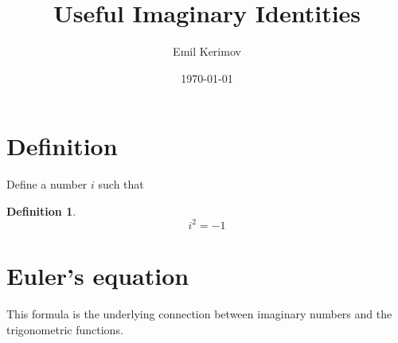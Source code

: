 \documentclass[a4paper]{article}
\title{Useful Imaginary Identities}
\author{Emil Kerimov}
\date{\today}
\begin{document}
\maketitle


\newtheorem{theorem}{Theorem}[section]
\newtheorem{corollary}{Corollary}[theorem]
\newtheorem{lemma}[theorem]{Lemma}
\newtheorem{definition}{Definition}[section]


\section{Definition}
Define a number $i$ such that 
\begin{definition} \label{i def}
$$
\boxed{
i^2 = -1
}$$
\end{definition}

\section{Euler's equation}
This formula is the underlying connection between imaginary numbers and the trigonometric functions.
\end{document}
